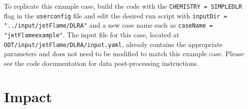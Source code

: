 \documentclass[preprint,12pt, a4paper]{elsarticle}
\begin{document}
To replicate this example case, build the code with the \texttt{CHEMISTRY = SIMPLEDLR} flag in the \texttt{user\textunderscore config} file and edit the desired run script with \texttt{inputDir = "../input/jetFlame/DLR\textunderscore A"} and a new case name such as \texttt{caseName = "jetFlame\textunderscore example"}. The input file for this case, located at \texttt{ODT/input/jetFlame/DLR\textunderscore A/input.yaml}, already contains the appropriate parameters and does not need to be modified to match this example case. Please see the code documentation for data post-processing instructions.


\section{Impact}
\label{sec:impact}
\end{document}
